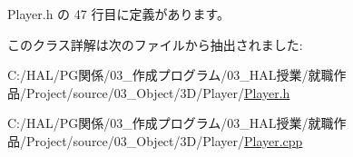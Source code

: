  Player.\+h の 47 行目に定義があります。



このクラス詳解は次のファイルから抽出されました\+:\begin{DoxyCompactItemize}
\item 
C\+:/\+H\+A\+L/\+P\+G関係/03\+\_\+作成プログラム/03\+\_\+\+H\+A\+L授業/就職作品/\+Project/source/03\+\_\+\+Object/3\+D/\+Player/\mbox{\hyperlink{_player_8h}{Player.\+h}}\item 
C\+:/\+H\+A\+L/\+P\+G関係/03\+\_\+作成プログラム/03\+\_\+\+H\+A\+L授業/就職作品/\+Project/source/03\+\_\+\+Object/3\+D/\+Player/\mbox{\hyperlink{_player_8cpp}{Player.\+cpp}}\end{DoxyCompactItemize}
